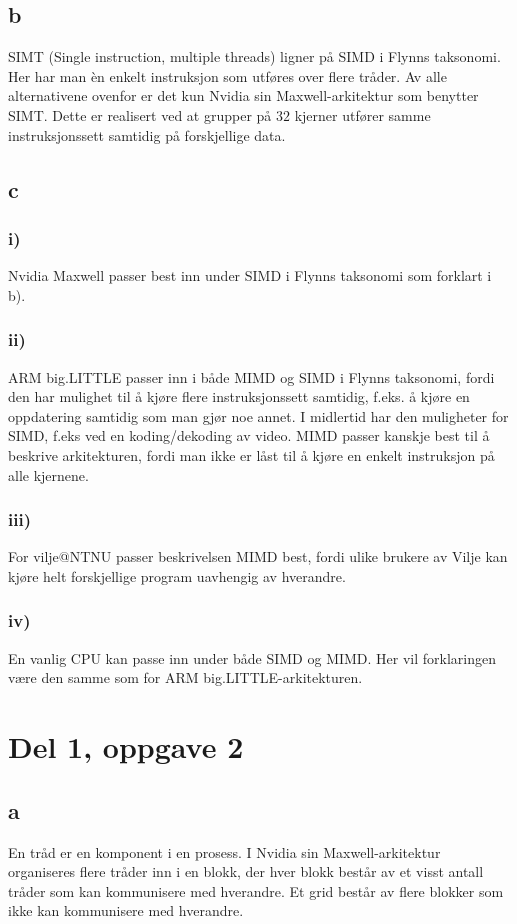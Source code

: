 \documentclass[12pt, a4paper]{article} %
\begin{document}
\subsection*{b}
SIMT (Single instruction, multiple threads) ligner på SIMD i Flynns taksonomi. Her har man èn enkelt instruksjon som utføres over flere tråder. Av alle alternativene ovenfor er det kun Nvidia sin Maxwell-arkitektur som benytter SIMT. Dette er realisert ved at grupper på $ 32 $ kjerner utfører samme instruksjonssett samtidig på forskjellige data.

\subsection*{c}
\subsubsection*{i)}
Nvidia Maxwell passer best inn under SIMD i Flynns taksonomi som forklart i b).
\subsubsection*{ii)}
ARM big.LITTLE passer inn i både MIMD og SIMD i Flynns taksonomi, fordi den har mulighet til å kjøre flere instruksjonssett samtidig, f.eks. å kjøre en oppdatering samtidig som man gjør noe annet. I midlertid har den muligheter for SIMD, f.eks ved en koding/dekoding av video. MIMD passer kanskje best til å beskrive arkitekturen, fordi man ikke er låst til å kjøre en enkelt instruksjon på alle kjernene.
\subsubsection*{iii)}
For vilje@NTNU passer beskrivelsen MIMD best, fordi ulike brukere av Vilje kan kjøre helt forskjellige program uavhengig av hverandre. 
\subsubsection*{iv)}
En vanlig CPU kan passe inn under både SIMD og MIMD. Her vil forklaringen være den samme som for ARM big.LITTLE-arkitekturen.


\section*{Del 1, oppgave 2}
\subsection*{a}
En tråd er en komponent i en prosess. I Nvidia sin Maxwell-arkitektur organiseres flere tråder inn i en blokk, der hver blokk består av et visst antall tråder som kan kommunisere med hverandre. Et grid består av flere blokker som ikke kan kommunisere med hverandre. 
\end{document}
